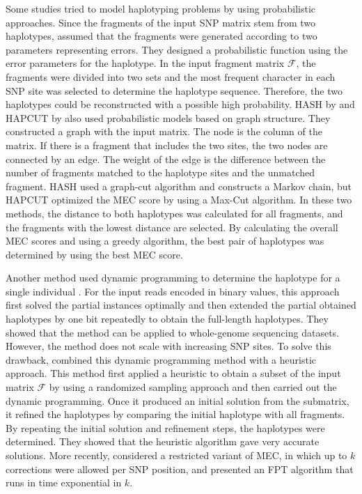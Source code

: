 Some studies tried to model haplotyping problems by using probabilistic approaches. 
Since the fragments of the input SNP matrix stem from two haplotypes, 
\cite{chen2008linear} assumed that the fragments were generated according to two parameters representing errors. 
They designed a probabilistic function using the error parameters for the haplotype. 
In the input fragment matrix $\mathcal{F}$, the fragments were divided into two sets and the most frequent character 
in each SNP site was selected to determine the haplotype sequence. 
Therefore, the two haplotypes could be reconstructed with a possible high probability. 
HASH by \cite{bansal2008mcmc} and HAPCUT by \cite{Bansal2008} also used probabilistic models based on graph structure. 
They constructed a graph with the input matrix. The node is the column of the matrix. 
If there is a fragment that includes the two sites, the two nodes are connected by an edge. 
The weight of the edge is the difference between the number of fragments matched to the haplotype sites and the unmatched fragment. 
HASH used a graph-cut algorithm and constructs a Markov chain, 
but HAPCUT optimized the MEC score by using a Max-Cut algorithm. 
In these two methods, the distance to both haplotypes was calculated for all fragments, and the fragments with the lowest distance are selected. 
By calculating the overall MEC scores and using a greedy algorithm, the best pair of haplotypes was determined by using the best MEC score.

Another method used dynamic programming to determine the haplotype for a single individual \citep{he2010optimal}. 
For the input reads encoded in binary values, this approach first solved the partial instances optimally and then extended the partial obtained haplotypes by one bit repeatedly to obtain the full-length haplotypes. 
They showed that the method can be applied to whole-genome sequencing datasets. However, the method does not scale with increasing SNP sites.
To solve this drawback, \cite{deng2013highly} combined this dynamic programming method with a heuristic approach. 
This method first applied a heuristic to obtain a subset of the input matrix $\mathcal{F}$ by using a randomized sampling approach and then carried out the dynamic programming. 
Once it produced an initial solution from the submatrix, it refined the haplotypes by comparing the initial haplotype with all fragments. 
By repeating the initial solution and refinement steps, the haplotypes were determined.
They showed that the heuristic algorithm gave very accurate solutions.
More recently, \cite{Pirola2015} considered a restricted variant of MEC, in which up to $k$ corrections were allowed per SNP position, 
and presented an FPT algorithm that runs in time exponential in $k$.

